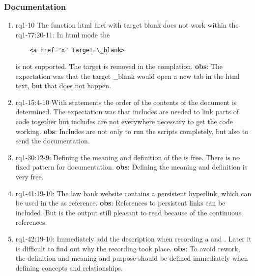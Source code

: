\subsubsection{Documentation}
\begin{comment}
plaats hier de afgehandelde items.
\end{comment}
\begin{enumerate}
    \item rq1-10 The function html href with target blank does not work within the 
    \newline rq1-77:20-11: In html mode the 
    \begin{lstlisting}
    <a href="x" target=\_blank>
    \end{lstlisting}
    is not supported.
    The target is removed in the complation.
    \newline\textbf{obs}: The expectation was that the target \_blank would open a new tab in the html text, but that does not happen.
    
    \item rq1-15:4-10 With  statements the order of the contents of the document is determined.
    The expectation was that includes are needed to link parts of code together but includes are not everywhere necessary to get the code working.
    \newline\textbf{obs}: Includes are not only to run the scripts completely, but also to send the documentation.
     
    \item rq1-30:12-9: Defining the meaning and definition of the  is free.
    There is no fixed pattern for documentation.
    \newline\textbf{obs}: Defining the meaning and definition is very free.
     
    \item rq1-41:19-10: The law bank website contains a persistent hyperlink, which can be used in the  as reference.
    \newline\textbf{obs}: References to persistent links can be included.
    But is the output still pleasant to read because of the continuous references.
     
    \item rq1-42:19-10: Immediately add the description when recording a  and .
    Later it is difficult to find out why the recording took place.
    \newline\textbf{obs}: To avoid rework, the definition and meaning and purpose should be defined immediately when defining concepts and relationships.
    

\end{enumerate}
